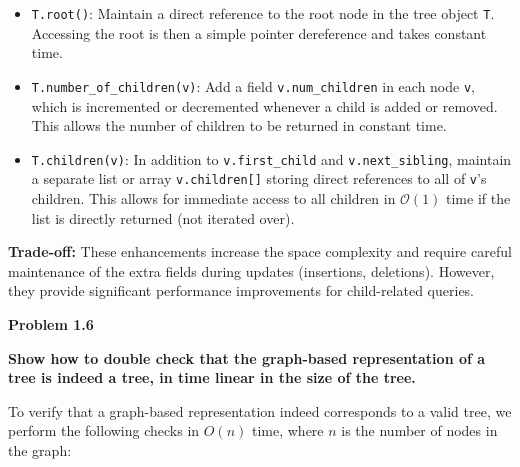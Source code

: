 \documentclass{article}
\begin{document}
\begin{itemize}
    \item \texttt{T.root()}: Maintain a direct reference to the root node in the tree object \texttt{T}. Accessing the root is then a simple pointer dereference and takes constant time.

    \item \texttt{T.number\_of\_children(v)}: Add a field \texttt{v.num\_children} in each node \texttt{v}, which is incremented or decremented whenever a child is added or removed. This allows the number of children to be returned in constant time.

    \item \texttt{T.children(v)}: In addition to \texttt{v.first\_child} and \texttt{v.next\_sibling}, maintain a separate list or array \texttt{v.children[]} storing direct references to all of \texttt{v}'s children. This allows for immediate access to all children in $\mathcal{O}(1)$ time if the list is directly returned (not iterated over).
\end{itemize}

\textbf{Trade-off:}  
These enhancements increase the space complexity and require careful maintenance of the extra fields during updates (insertions, deletions). However, they provide significant performance improvements for child-related queries.

\textbf{Problem 1.6}

\textbf{Show how to double check that the graph-based representation of a tree is indeed a tree, in time linear in the size of the tree.}

To verify that a graph-based representation indeed corresponds to a valid tree, we perform the following checks in $O(n)$ time, where $n$ is the number of nodes in the graph:
\end{document}
